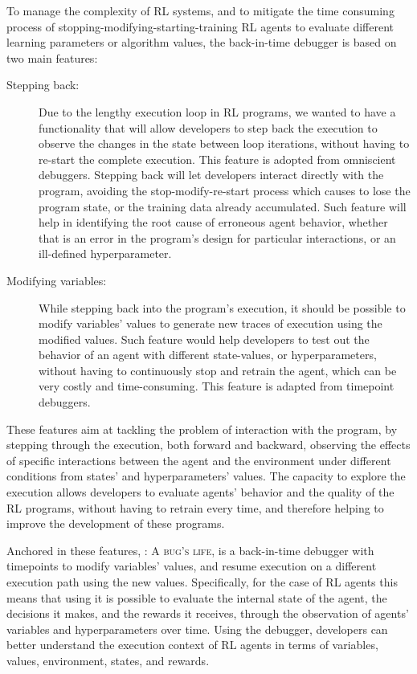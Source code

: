 To manage the complexity of \ac{RL} systems, and to mitigate the time consuming process of 
stopping-modifying-starting-training \ac{RL} agents to evaluate different learning parameters or 
algorithm values, the \flik back-in-time debugger is based on two main features:
\begin{description}
    \item[Stepping back:] Due to the lengthy execution loop in \ac{RL} programs, we 
    wanted to have a functionality that will allow developers to step back the execution to observe the 
    changes in the state between loop iterations, without having to re-start the complete execution.  
    This feature is adopted from omniscient debuggers.
    Stepping back will let developers interact directly with the program, 
    avoiding the stop-modify-re-start process which causes to lose the program state, or the training 
    data already accumulated. Such feature will help in identifying the root cause of erroneous agent 
    behavior, whether that is an error in the program's design for particular interactions, or an ill-defined 
    hyperparameter. 
    \item [Modifying variables:] While stepping back into the program's execution, it should be possible 
    to modify variables' values to generate new traces of execution using the modified values. 
    Such feature would help developers to test out the behavior of an agent with different state-values, 
    or hyperparameters, without having to continuously stop and retrain the agent, which can be very 
    costly and time-consuming. This feature is adapted from timepoint debuggers.
\end{description}

These features aim at tackling the problem of interaction with the program, by stepping through the 
execution, both forward and backward, observing the effects of specific interactions between the agent 
and the environment under different conditions from states' and hyperparameters' values. The capacity 
to explore the execution allows developers to evaluate agents' behavior and the quality of the \ac{RL} 
programs, without having to retrain every time, and therefore helping to improve the development of 
these programs.

Anchored in these features, \flik: \textsc{A bug's life}, is a back-in-time debugger with timepoints 
to modify variables' values, and resume execution on a different execution path using the new values. 
Specifically, for the case of \ac{RL} agents this means that using \flik it is 
possible to evaluate the internal state of the agent, the decisions it makes, and the rewards 
it receives, through the observation of agents' variables and hyperparameters over time. Using the 
debugger, developers can better understand the execution context of \ac{RL} agents in terms of 
variables, values, environment, states, and rewards. 

